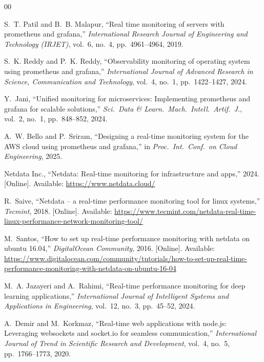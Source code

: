 \documentclass[conference]{IEEEtran}
\begin{document}
\begin{thebibliography}{00}

S.~T. Patil and B.~B. Malapur, ``Real time monitoring of servers with prometheus and grafana,'' \emph{International Research Journal of Engineering and Technology (IRJET)}, vol.~6, no.~4, pp.~4961--4964, 2019.

S.~K. Reddy and P.~K. Reddy, ``Observability monitoring of operating system using prometheus and grafana,'' \emph{International Journal of Advanced Research in Science, Communication and Technology}, vol.~4, no.~1, pp.~1422--1427, 2024.

Y.~Jani, ``Unified monitoring for microservices: Implementing prometheus and grafana for scalable solutions,'' \emph{Sci.\ Data \& Learn.\ Mach.\ Intell.\ Artif.\ J.}, vol.~2, no.~1, pp.~848--852, 2024.

A.~W. Bello and P.~Sriram, ``Designing a real-time monitoring system for the {AWS} cloud using prometheus and grafana,'' in \emph{Proc.\ Int.\ Conf.\ on Cloud Engineering}, 2025.

Netdata Inc., ``Netdata: Real-time monitoring for infrastructure and apps,'' 2024. [Online]. Available: \url{https://www.netdata.cloud/}

R.~Saive, ``Netdata -- a real-time performance monitoring tool for linux systems,'' \emph{Tecmint}, 2018. [Online]. Available: \url{https://www.tecmint.com/netdata-real-time-linux-performance-network-monitoring-tool/}

M.~Santos, ``How to set up real-time performance monitoring with netdata on ubuntu 16.04,'' \emph{DigitalOcean Community}, 2016. [Online]. Available: \url{https://www.digitalocean.com/community/tutorials/how-to-set-up-real-time-performance-monitoring-with-netdata-on-ubuntu-16-04}

M.~A. Jazayeri and A.~Rahimi, ``Real-time performance monitoring for deep learning applications,'' \emph{International Journal of Intelligent Systems and Applications in Engineering}, vol.~12, no.~3, pp.~45--52, 2024.

A.~Demir and M.~Korkmaz, ``Real-time web applications with node.js: Leveraging websockets and socket.io for seamless communication,'' \emph{International Journal of Trend in Scientific Research and Development}, vol.~4, no.~5, pp.~1766--1773, 2020.


\end{thebibliography}
\end{document}
